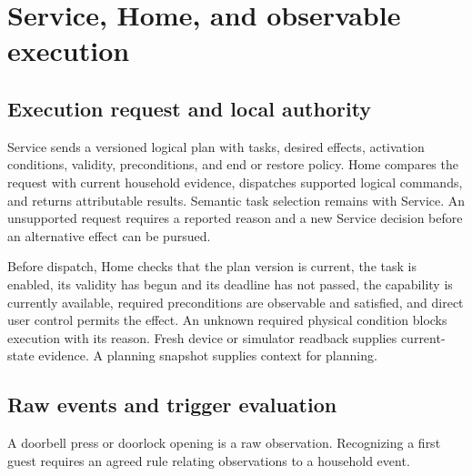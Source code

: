 \section{Service, Home, and observable execution}
\label{sec:execution}

\subsection{Execution request and local authority}

Service sends a versioned logical plan with tasks, desired effects, activation conditions, validity, preconditions, and end or restore policy. Home compares the request with current household evidence, dispatches supported logical commands, and returns attributable results. Semantic task selection remains with Service. An unsupported request requires a reported reason and a new Service decision before an alternative effect can be pursued. 

 


Before dispatch, Home checks that the plan version is current, the task is enabled, its validity has begun and its deadline has not passed, the capability is currently available, required preconditions are observable and satisfied, and direct user control permits the effect. An unknown required physical condition blocks execution with its reason. Fresh device or simulator readback supplies current-state evidence. A planning snapshot supplies context for planning. 

\subsection{Raw events and trigger evaluation}

A doorbell press or doorlock opening is a raw observation. Recognizing a first guest requires an agreed rule relating observations to a household event.


